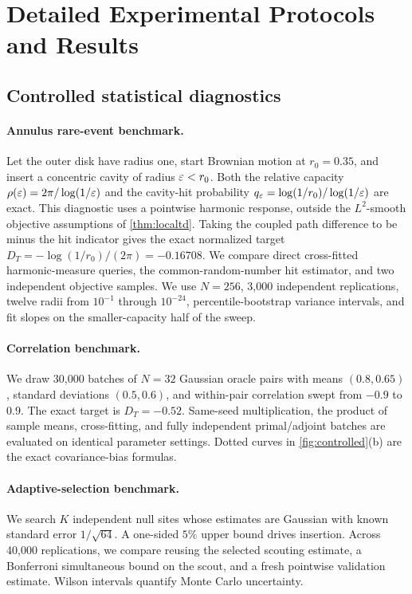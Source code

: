\section{Detailed Experimental Protocols and Results}
\label{app:experiments}

\subsection{Controlled statistical diagnostics}

\paragraph{Annulus rare-event benchmark.}
Let the outer disk have radius one, start Brownian motion at $r_0=0.35$, and insert a concentric cavity of radius $\varepsilon<r_0$.  Both the relative capacity
$\rho(\varepsilon)=2\pi/\log(1/\varepsilon)$ and the cavity-hit probability
$q_\varepsilon=\log(1/r_0)/\log(1/\varepsilon)$ are exact.  This diagnostic uses a pointwise harmonic response, outside the $L^2$-smooth objective assumptions of \cref{thm:localtd}. Taking the coupled path difference to be minus the hit indicator gives the exact normalized target
$D_T=-\log(1/r_0)/(2\pi)=-0.16708$.  We compare direct cross-fitted harmonic-measure queries, the common-random-number hit estimator, and two independent objective samples.  We use $N=256$, 3,000 independent replications, twelve radii from $10^{-1}$ through $10^{-24}$, percentile-bootstrap variance intervals, and fit slopes on the smaller-capacity half of the sweep.

\paragraph{Correlation benchmark.}
We draw 30,000 batches of $N=32$ Gaussian oracle pairs with means $(0.8,0.65)$, standard deviations $(0.5,0.6)$, and within-pair correlation swept from $-0.9$ to $0.9$.  The exact target is $D_T=-0.52$.  Same-seed multiplication, the product of sample means, cross-fitting, and fully independent primal/adjoint batches are evaluated on identical parameter settings.  Dotted curves in \cref{fig:controlled}(b) are the exact covariance-bias formulas.

\paragraph{Adaptive-selection benchmark.}
We search $K$ independent null sites whose estimates are Gaussian with known standard error $1/\sqrt{64}$.  A one-sided $5\%$ upper bound drives insertion.  Across 40,000 replications, we compare reusing the selected scouting estimate, a Bonferroni simultaneous bound on the scout, and a fresh pointwise validation estimate.  Wilson intervals quantify Monte Carlo uncertainty.




